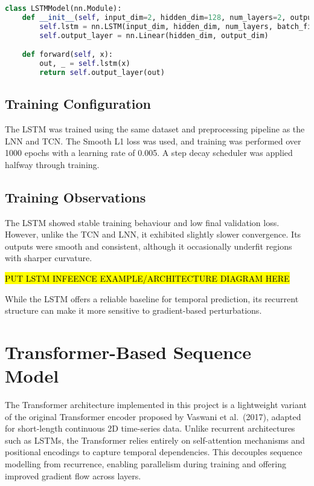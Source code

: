 \begin{lstlisting}[language=Python, caption={Simplified LSTM model structure}]
class LSTMModel(nn.Module):
    def __init__(self, input_dim=2, hidden_dim=128, num_layers=2, output_dim=2):
        self.lstm = nn.LSTM(input_dim, hidden_dim, num_layers, batch_first=True)
        self.output_layer = nn.Linear(hidden_dim, output_dim)

    def forward(self, x):
        out, _ = self.lstm(x)
        return self.output_layer(out)
\end{lstlisting}

\subsection{Training Configuration}
The LSTM was trained using the same dataset and preprocessing pipeline as the LNN and TCN. The Smooth L1 loss was used, and training was performed over 1000 epochs with a learning rate of 0.005. A step decay scheduler was applied halfway through training.

\subsection{Training Observations}
The LSTM showed stable training behaviour and low final validation loss. However, unlike the TCN and LNN, it exhibited slightly slower convergence. Its outputs were smooth and consistent, although it occasionally underfit regions with sharper curvature.

\hl{PUT LSTM INFEENCE EXAMPLE/ARCHITECTURE DIAGRAM HERE}


While the LSTM offers a reliable baseline for temporal prediction, its recurrent structure can make it more sensitive to gradient-based perturbations.


\section{Transformer-Based Sequence Model}

The Transformer architecture implemented in this project is a lightweight variant of the original Transformer encoder proposed by Vaswani et al.~(2017), adapted for short-length continuous 2D time-series data. Unlike recurrent architectures such as LSTMs, the Transformer relies entirely on self-attention mechanisms and positional encodings to capture temporal dependencies. This decouples sequence modelling from recurrence, enabling parallelism during training and offering improved gradient flow across layers.

